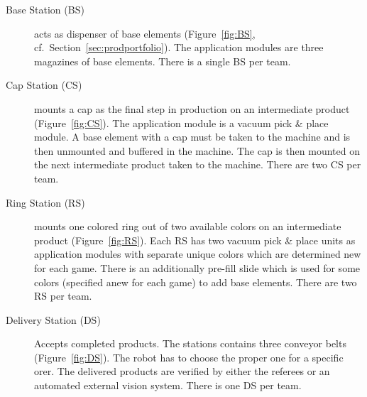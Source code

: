 \documentclass[12pt,twoside]{article}
\newcommand{\refsec}[1]{Section~\ref{#1}}
\newcommand{\reffig}[1]{Figure~\ref{#1}}
\begin{document}
\begin{description}
\item[Base Station (BS)] acts as dispenser of base
  elements (\reffig{fig:BS}, cf.~\refsec{sec:prodportfolio}). The application modules
  are three magazines of base elements. There is a single BS per team.

\item[Cap Station (CS)] mounts a cap as the final step in production
  on an intermediate product (\reffig{fig:CS}). The application module
  is a vacuum pick \& place module. A base element with a cap must be
  taken to the machine and is then unmounted and buffered in the
  machine. The cap is then mounted on the next intermediate product
  taken to the machine. There are two CS per team.

\item[Ring Station (RS)] mounts one colored ring out of two available
  colors on an intermediate product (\reffig{fig:RS}). Each RS has two
  vacuum pick \& place units as application modules with separate
  unique colors which are determined new for each game. There is an
  additionally pre-fill slide which is used for some colors (specified
  anew for each game) to add base elements. There are two RS per team.

\item[Delivery Station (DS)] Accepts completed products. The stations
  contains three conveyor belts (\reffig{fig:DS}). The robot has to
  choose the proper one for a specific orer. The delivered products
  are verified by either the referees or an automated external vision
  system. There is one DS per team.
\end{description}
\end{document}
